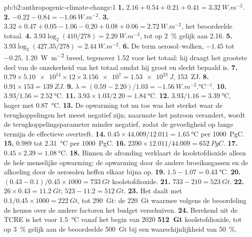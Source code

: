 \begin{solution}{pb:b2:anthropogenic-climate-change:1}
\textbf{1.} $2.16 + 0.54 + 0.21 + 0.41 = \qty{3.32}{W.m^{-2}}$.
\textbf{2.} $-0.22 - 0.84 = \qty{-1.06}{W.m^{-2}}$.
\textbf{3.} $3.32 + 0.47 + 0.05 - 1.06 - 0.20 + 0.08 + 0.06 = \qty{2.72}{W.m^{-2}}$, het beoordeelde
totaal.
\textbf{4.} $3.93\log_2(410/278) = \qty{2.20}{W.m^{-2}}$, tot op \qty{2}{\percent} gelijk aan 2.16.
\textbf{5.} $3.93\log_2(427.35/278) = \qty{2.44}{W.m^{-2}}$.
\textbf{6.} De term aerosol--wolken, $-1.45$ tot $-0.25$, \qty{1.20}{W.m^{-2}} breed, tegenover 1.52 voor
het totaal: hij draagt het grootste deel van de onzekerheid van het totaal omdat hij groot en slecht
bepaald is.
\textbf{7.} $0.79 \times \num{5.10e14} \times 12 \times \num{3.156e7} = \qty{1.53e23}{J}$,
\qty{153}{ZJ}.
\textbf{8.} $0.91 \times 153 = \qty{139}{ZJ}$.
\textbf{9.} $\lambda = (0.59 - 2.20)/1.03 = \qty{-1.56}{W.m^{-2}.\celsius^{-1}}$.
\textbf{10.} $3.93/1.56 = \qty{2.52}{\celsius}$.
\textbf{11.} $3.93 \times 1.03/2.20 = \qty{1.84}{\celsius}$.
\textbf{12.} $3.93/1.16 = \qty{3.39}{\celsius}$, hoger met \qty{0.87}{\celsius}.
\textbf{13.} De opwarming tot nu toe was het sterkst waar de terugkoppelingen het meest negatief zijn; naarmate het
patroon verandert, wordt de terugkoppelingsparameter minder negatief, zodat de gevoeligheid op lange termijn
de effectieve overtreft.
\textbf{14.} $0.45 \times 44.009/12.011 = \qty{1.65}{\celsius}$ per \qty{1000}{PgC}.
\textbf{15.} 0.989 tot \qty{2.31}{\celsius} per \qty{1000}{PgC}.
\textbf{16.} $2390 \times 12.011/44.009 = \qty{652}{PgC}$.
\textbf{17.} $0.45 \times 2.39 = \qty{1.08}{\celsius}$.
\textbf{18.} Binnen de afronding verklaart de koolstofdioxide alleen de hele menselijke opwarming: de
opwarming door de andere broeikasgassen en de afkoeling door de aerosolen heffen elkaar bijna op.
\textbf{19.} $1.5 - 1.07 = \qty{0.43}{\celsius}$.
\textbf{20.} $(0.43 - 0.1)/0.45 \times 1000 = \qty{733}{Gt}$ koolstofdioxide.
\textbf{21.} $733 - 210 = \qty{523}{Gt}$.
\textbf{22.} $26 \times 0.43 = \qty{11.2}{Gt}$; $523 - 11.2 = \qty{512}{Gt}$.
\textbf{23.} Het daalt met $0.1/0.45 \times 1000 = \qty{222}{Gt}$, tot \qty{290}{Gt}: de
\qty{220}{Gt} waarmee volgens de beoordeling de keuzes over de andere factoren het budget verschuiven.
\textbf{24.} Berekend uit de TCRE is het  voor \qty{1.5}{\celsius} vanaf het
begin van 2020 \textbf{\qty[text-series-to-math=true]{512}{Gt}} koolstofdioxide, tot op
\qty{3}{\percent} gelijk aan de beoordeelde \qty{500}{Gt} bij een waarschijnlijkheid van \qty{50}{\percent}.
\end{solution}

